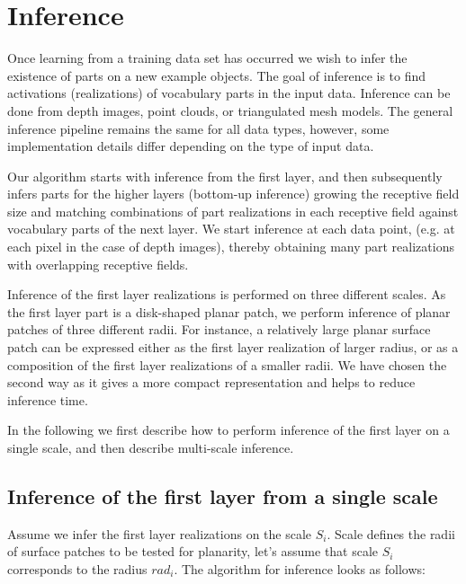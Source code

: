 \documentclass[runningheads]{llncs}
\begin{document}
\section{Inference\label{sec:Inference}}

Once learning from a training data set has occurred we wish to infer
the existence of parts on a new example objects. The goal of
inference is to find activations (realizations) of vocabulary parts
in the input data. Inference can be done from depth images, point
clouds, or triangulated mesh models. The general inference pipeline
remains the same for all data types, however, some implementation
details differ depending on the type of input data.

Our algorithm starts with inference from the first layer, and then
subsequently infers parts for the higher layers (bottom-up
inference) growing the receptive field size and matching
combinations of part realizations in each receptive field against
vocabulary parts of the next layer. We start inference at each data
point, (e.g. at each pixel in the case of depth images), thereby
obtaining many part realizations with overlapping receptive fields.

Inference of the first layer realizations is performed on three
different scales. As the first layer part is a disk-shaped planar
patch, we perform inference of planar patches of three different
radii. For instance, a relatively large planar surface patch can be
expressed either as the first layer realization of larger radius, or
as a composition of the first layer realizations of a smaller radii.
We have chosen the second way as it gives a more compact
representation and helps to reduce inference time.

In the following we first describe how to perform inference of the
first layer on a single scale, and then describe multi-scale
inference.

\subsection{Inference of the first layer from a single scale\label{sec:InferenceFirstSingle}}

Assume we infer the first layer realizations on the scale $S_i$.
Scale defines the radii of surface patches to be tested for
planarity, let's assume that scale $S_i$ corresponds to the radius
$rad_i$. The algorithm for inference looks as follows:
\end{document}

